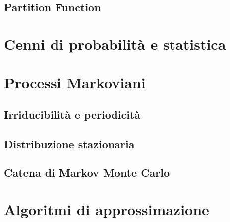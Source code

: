 \subsection{Partition Function}

\section{Cenni di probabilità e statistica}

\section{Processi Markoviani}
\subsection{Irriducibilità e periodicità}
\subsection{Distribuzione stazionaria}
\subsection{Catena di Markov Monte Carlo}

\section{Algoritmi di approssimazione}